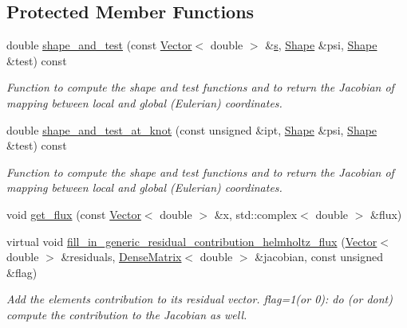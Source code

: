 \subsection*{Protected Member Functions}
\begin{DoxyCompactItemize}
\item 
double \hyperlink{classoomph_1_1HelmholtzFluxElement_a7d4c36738cba6e0620fa394d66ea28c5}{shape\+\_\+and\+\_\+test} (const \hyperlink{classoomph_1_1Vector}{Vector}$<$ double $>$ \&\hyperlink{cfortran_8h_ab7123126e4885ef647dd9c6e3807a21c}{s}, \hyperlink{classoomph_1_1Shape}{Shape} \&psi, \hyperlink{classoomph_1_1Shape}{Shape} \&test) const
\begin{DoxyCompactList}\small\item\em Function to compute the shape and test functions and to return the Jacobian of mapping between local and global (Eulerian) coordinates. \end{DoxyCompactList}\item 
double \hyperlink{classoomph_1_1HelmholtzFluxElement_a463b7abfac1cc3aa698437b484b51683}{shape\+\_\+and\+\_\+test\+\_\+at\+\_\+knot} (const unsigned \&ipt, \hyperlink{classoomph_1_1Shape}{Shape} \&psi, \hyperlink{classoomph_1_1Shape}{Shape} \&test) const
\begin{DoxyCompactList}\small\item\em Function to compute the shape and test functions and to return the Jacobian of mapping between local and global (Eulerian) coordinates. \end{DoxyCompactList}\item 
void \hyperlink{classoomph_1_1HelmholtzFluxElement_a0e43870b7dc404d05c58c835a79e7121}{get\+\_\+flux} (const \hyperlink{classoomph_1_1Vector}{Vector}$<$ double $>$ \&x, std\+::complex$<$ double $>$ \&flux)
\item 
virtual void \hyperlink{classoomph_1_1HelmholtzFluxElement_a4f6caf80f078c526144990ee77bfaf92}{fill\+\_\+in\+\_\+generic\+\_\+residual\+\_\+contribution\+\_\+helmholtz\+\_\+flux} (\hyperlink{classoomph_1_1Vector}{Vector}$<$ double $>$ \&residuals, \hyperlink{classoomph_1_1DenseMatrix}{Dense\+Matrix}$<$ double $>$ \&jacobian, const unsigned \&flag)
\begin{DoxyCompactList}\small\item\em Add the element\textquotesingle{}s contribution to its residual vector. flag=1(or 0)\+: do (or don\textquotesingle{}t) compute the contribution to the Jacobian as well. \end{DoxyCompactList}\end{DoxyCompactItemize}
